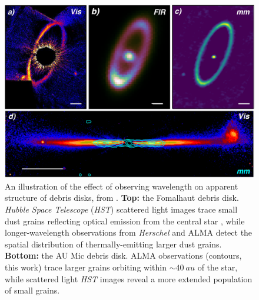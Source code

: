 \documentclass[12pt,oneside]{book}
\begin{document}
\begin{figure}
  \includegraphics[width=\linewidth]{../figures/hughes_etal18_observation_comparison}
  \caption{
  An illustration of the effect of observing wavelength on apparent structure of debris disks, from \cite{hughes18}. 
  \textbf{Top:} the Fomalhaut debris disk.
  \textit{Hubble Space Telescope} (\textit{HST}) scattered light images trace small dust grains reflecting optical emission from the central star \citep[\textbf{a},][]{kalas13}, while longer-wavelength observations from \textit{Herschel} \citep[\textbf{b},][]{acke12} and ALMA \citep[\textbf{c},][]{macgregor17} detect the spatial distribution of thermally-emitting larger dust grains.
  \textbf{Bottom:} the AU Mic debris disk. ALMA observations (contours, this work) trace larger grains orbiting within $\sim \SI{40}{au}$ of the star, while scattered light \textit{HST} images \citep[colormap,][]{schneider14} reveal a more extended population of small grains.
  }
  \label{fig: observation comparison}
\end{figure}
\end{document}
